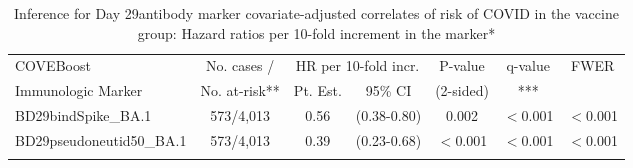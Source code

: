 \begin{longtable}{lcccccc}
\caption{Inference for Day 29antibody marker covariate-adjusted correlates of risk of COVID in the vaccine group: Hazard ratios per 10-fold increment in the marker*} \\ 
   \hline
 
         \multicolumn{1}{l}{COVEBoost} & \multicolumn{1}{c}{No. cases /}   & \multicolumn{2}{c}{HR per 10-fold incr.}                     & \multicolumn{1}{c}{P-value}   & \multicolumn{1}{c}{q-value}   & \multicolumn{1}{c}{FWER} \\ 
         \multicolumn{1}{l}{Immunologic Marker}            & \multicolumn{1}{c}{No. at-risk**} & \multicolumn{1}{c}{Pt. Est.} & \multicolumn{1}{c}{95\% CI} & \multicolumn{1}{c}{(2-sided)} & \multicolumn{1}{c}{***} & \multicolumn{1}{c}{} \\ 
         \hline
 
    BD29bindSpike\_BA.1 & 573/4,013 & 0.56 & (0.38-0.80) & 0.002 & $<$0.001 & $<$0.001 \\ 
  BD29pseudoneutid50\_BA.1 & 573/4,013 & 0.39 & (0.23-0.68) & $<$0.001 & $<$0.001 & $<$0.001 \\ 
   \hline
\hline
\label{tab:CoR_univariable_svycoxph_pretty}
\end{longtable}
